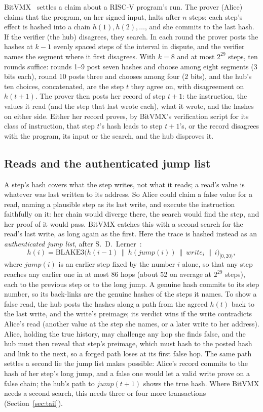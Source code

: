 \documentclass[11pt]{article}
\begin{document}
BitVMX~\cite{bitvmx} settles a claim about a RISC-V program's run. The
prover (Alice) claims that the program, on her signed input, halts after
$n$ steps; each step's effect is hashed into a chain $h(1), h(2),
\ldots$, and she commits to the last hash. If the verifier (the hub)
disagrees, they search. In each round the prover posts the hashes at
$k-1$ evenly spaced steps of the interval in dispute, and the verifier
names the segment where it first disagrees. With $k = 8$ and at most
$2^{29}$ steps, ten rounds suffice: rounds 1--9 post seven hashes and
choose among eight segments (3 bits each), round 10 posts three and
chooses among four (2 bits), and the hub's ten choices, concatenated,
are the step $t$ they agree on, with disagreement on $h(t+1)$. The
prover then posts her record of step $t+1$: the instruction, the values
it read (and the step that last wrote each), what it wrote, and the
hashes on either side. Either her record proves, by BitVMX's verification
script for its class of instruction, that step $t$'s hash leads to step
$t+1$'s, or the record disagrees with the program, its input or the
search, and the hub disproves it.

\subsection{Reads and the authenticated jump list}
\label{sec:reads}

A step's hash covers what the step writes, not what it reads; a read's
value is whatever was last written to its address. So Alice could claim
a false value for a read, naming a plausible step as its last write,
and execute the instruction faithfully on it: her chain would diverge
there, the search would find the step, and her proof of it would pass.
BitVMX catches this with a second search for the read's last write, as
long again as the first. Here the trace is hashed instead as an
\emph{authenticated jump list}, after S.~D.~Lerner~\cite{bitvmxinnov}:
\[
  h(i) = \mathrm{BLAKE3}\big(h(i-1) \,\|\, h(\mathit{jump}(i)) \,\|\,
  \mathit{write}_i \,\|\, i\big)_{[0,20)},
\]
where $\mathit{jump}(i)$ is an earlier step fixed by the number $i$
alone, so that any step reaches any earlier one in at most 86 hops (about
52 on average at $2^{29}$ steps), each to the previous step or to the
long jump. A genuine hash commits to its step number, so its back-links
are the genuine hashes of the steps it names. To show a false read, the
hub posts the hashes along a path from the agreed $h(t)$ back to the
last write, and the write's preimage; its verdict wins if the write
contradicts Alice's read (another value at the step she names, or a
later write to her address). Alice, holding the true history, may
challenge any hop she finds false, and the hub must then reveal that
step's preimage, which must hash to the posted hash and link to the
next, so a forged path loses at its first false hop. The same path
settles a second lie the jump list makes possible: Alice's record
commits to the hash of her step's long jump, and a false one would let
a valid write prove on a false chain; the hub's path to
$\mathit{jump}(t+1)$ shows the true hash. Where BitVMX needs a second
search, this needs three or four more transactions
(Section~\ref{sec:tail}).
\end{document}
